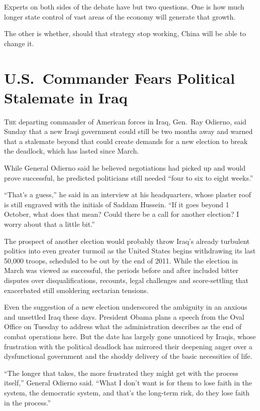 ﻿\documentclass[12pt]{article}
\begin{document}
Experts on both sides of the debate have but two questions. One is how much longer state control of
vast areas of the economy will generate that growth.

The other is whether, should that strategy stop working, China will be able to change it.

\pagebreak
\section{U.S.~Commander Fears Political Stalemate in Iraq}

\lettrine{T}{he} departing commander of American forces in Iraq, Gen.~Ray
Odierno, said Sunday that a new Iraqi government could still be two months away and warned that a
stalemate beyond that could create demands for a new election to break the deadlock, which has
lasted since March.

While General Odierno said he believed negotiations had picked up and would prove successful, he
predicted politicians still needed ``four to six to eight weeks.''

``That's a guess,'' he said in an interview at his headquarters, whose plaster roof is still
engraved with the initials of Saddam Hussein. ``If it goes beyond 1 October, what does that mean?
Could there be a call for another election? I worry about that a little bit.''

The prospect of another election would probably throw Iraq's already turbulent politics into even
greater turmoil as the United States begins withdrawing its last 50,000 troops, scheduled to be out
by the end of 2011. While the election in March was viewed as successful, the periods before and
after included bitter disputes over disqualifications, recounts, legal challenges and score-settling
that exacerbated still smoldering sectarian tensions.

Even the suggestion of a new election underscored the ambiguity in an anxious and unsettled Iraq
these days. President Obama plans a speech from the Oval Office on Tuesday to address what the
administration describes as the end of combat operations here. But the date has largely gone
unnoticed by Iraqis, whose frustration with the political deadlock has mirrored their deepening
anger over a dysfunctional government and the shoddy delivery of the basic necessities of life.

``The longer that takes, the more frustrated they might get with the process itself,'' General
Odierno said. ``What I don't want is for them to lose faith in the system, the democratic system,
and that's the long-term risk, do they lose faith in the process.''
\end{document}

